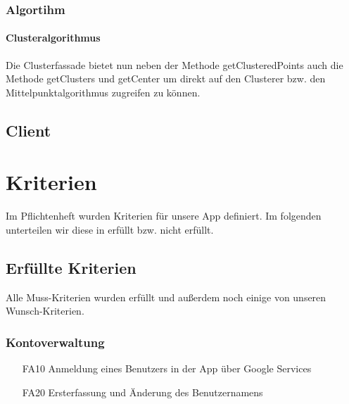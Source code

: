 \documentclass{scrartcl}
\begin{document}
	\subsubsection{Algortihm}	
	\paragraph{Clusteralgorithmus}
	Die Clusterfassade bietet nun neben der Methode getClusteredPoints auch die Methode getClusters und getCenter um direkt auf den Clusterer bzw. den Mittelpunktalgorithmus zugreifen zu können. 
	

	\subsection{Client}
	\newpage
	\section{Kriterien}
	Im Pflichtenheft wurden Kriterien für unsere App definiert. Im folgenden unterteilen wir diese in erfüllt bzw. nicht erfüllt.

	
	\subsection{Erfüllte Kriterien}
		Alle Muss-Kriterien wurden erfüllt und außerdem noch einige von unseren Wunsch-Kriterien.
		
	\subsubsection{Kontoverwaltung}
	\begin{itemize}
		\item[FA10] Anmeldung eines Benutzers in der App über Google Services
		\item[FA20] Ersterfassung und Änderung des Benutzernamens
	\end{itemize}
	
\end{document}
